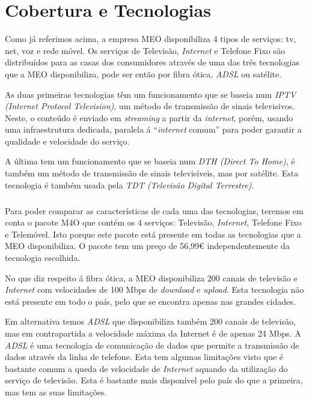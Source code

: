 \documentclass{report}
\begin{document}
\chapter{Cobertura e Tecnologias}
\label{chap.coberturaEtecnologias}

Como já referimos acima, a empresa MEO disponibiliza 4 tipos de serviços: tv, net, voz e rede móvel. Os serviços de Televisão, \textit{Internet} e Telefone Fixo são distribuídos para as casas dos consumidores através de uma das três tecnologias que a MEO disponibiliza, pode ser então por fibra ótica, \textit{ADSL} ou satélite.
 
	As duas primeiras tecnologias têm um funcionamento que se baseia num \textit{IPTV (Internet Protocol Television)}, um método de transmissão de sinais televisivos. Neste, o conteúdo é enviado em \textit{streaming} a partir da \textit{internet}, porém, usando uma infraestrutura dedicada, paralela á “\textit{internet} comum” para poder garantir a qualidade e velocidade do serviço.

	A última tem um funcionamento que se baseia num \textit{DTH (Direct To Home)}, é também um método de transmissão de sinais televisíveis, mas por satélite. Esta tecnologia é também usada pela \textit{TDT (Televisão Digital Terrestre)}.

\paragraph{}
	Para poder comparar as características de cada uma das tecnologias, teremos em conta o pacote M4O que contém os 4 serviços: Televisão, \textit{Internet}, Telefone Fixo e Telemóvel. Isto porque este pacote está presente em todas as tecnologias que a MEO disponibiliza. O pacote tem um preço de 56,99\euro{} independentemente da tecnologia escolhida.
 
	No que diz respeito á fibra ótica, a MEO disponibiliza 200 canais de televisão e \textit{Internet} com velocidades de 100 Mbps de \textit{download} e \textit{upload}. Esta tecnologia não está presente em todo o país, pelo que se encontra apenas nas grandes cidades. 

	Em alternativa temos \textit{ADSL} que disponibiliza também 200 canais de televisão, mas em contrapartida a velocidade máxima da Internet é de apenas 24 Mbps. A \textit{ADSL} é uma tecnologia de comunicação de dados que permite a transmissão de dados através da linha de telefone. Esta tem algumas limitações visto que é bastante comum a queda de velocidade de \textit{Internet} aquando da utilização do serviço de televisão. Esta é bastante mais disponível pelo país do que a primeira, mas tem as suas limitações. 
\end{document}
